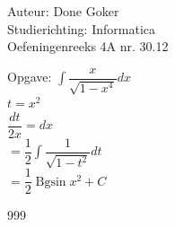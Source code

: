 \documentclass[a4paper]{article}
\begin{document}
  
\noindent \large Auteur: Done Goker \\
\noindent \large Studierichting: Informatica\\
\noindent \large Oefeningenreeks 4A nr. 30.12\\

\medskip

\normalsize

Opgave:
$\displaystyle\int \dfrac{x}{\sqrt{1-x^4}} dx$ \\

$t = x^2$ \\

$ \dfrac{dt}{2x}  = dx$ \\

$= \dfrac{1}{2}\displaystyle\int \dfrac{1}{\sqrt{1-t^{2}}}dt $ \\

$=\dfrac{1}{2} \operatorname{Bgsin} x^2 + C$




\begin{thebibliography}{999}
\end{thebibliography}
\end{document}
